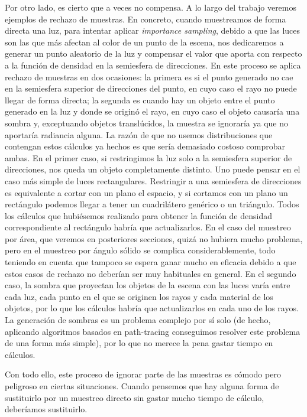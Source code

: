 \documentclass{scrbook}
\begin{document}
Por otro lado, es cierto que a veces no compensa. A lo largo del trabajo veremos ejemplos de rechazo de muestras. En concreto, cuando muestreamos de forma directa una luz, para intentar aplicar \textit{importance sampling}, debido a que las luces son las que más afectan al color de un punto de la escena, nos dedicaremos a generar un punto aleatorio de la luz y compensar el valor que aporta con respecto a la función de densidad en la semiesfera de direcciones. En este proceso se aplica rechazo de muestras en dos ocasiones: la primera es si el punto generado no cae en la semiesfera superior de direcciones del punto, en cuyo caso el rayo no puede llegar de forma directa; la segunda es cuando hay un objeto entre el punto generado en la luz y donde se originó el rayo, en cuyo caso el objeto causaría una sombra y, exceptuando objetos translúcidos, la muestra se ignoraría ya que no aportaría radiancia alguna. La razón de que no usemos distribuciones que contengan estos cálculos ya hechos es que sería demasiado costoso comprobar ambas. En el primer caso, si restringimos la luz solo a la semiesfera superior de direcciones, nos queda un objeto completamente distinto. Uno puede pensar en el caso más simple de luces rectangulares. Restringir a una semiesfera de direcciones es equivalente a cortar con un plano el espacio, y si cortamos con un plano un rectángulo podemos llegar a tener un cuadrilátero genérico o un triángulo. Todos los cálculos que hubiésemos realizado para obtener la función de densidad correspondiente al rectángulo habría que actualizarlos. En el caso del muestreo por área, que veremos en posteriores secciones, quizá no hubiera mucho problema, pero en el muestreo por ángulo sólido se complica considerablemente, todo teniendo en cuenta que tampoco se espera ganar mucho en eficacia debido a que estos casos de rechazo no deberían ser muy habituales en general. En el segundo caso, la sombra que proyectan los objetos de la escena con las luces varía entre cada luz, cada punto en el que se originen los rayos y cada material de los objetos, por lo que los cálculos habría que actualizarlos en cada uno de los rayos. La generación de sombras es un problema complejo por sí solo (de hecho, aplicando algoritmos basados en path-tracing conseguimos resolver este problema de una forma más simple), por lo que no merece la pena gastar tiempo en cálculos.

Con todo ello, este proceso de ignorar parte de las muestras es cómodo pero peligroso en ciertas situaciones. Cuando pensemos que hay alguna forma de sustituirlo por un muestreo directo sin gastar mucho tiempo de cálculo, deberíamos sustituirlo. 
\end{document}
